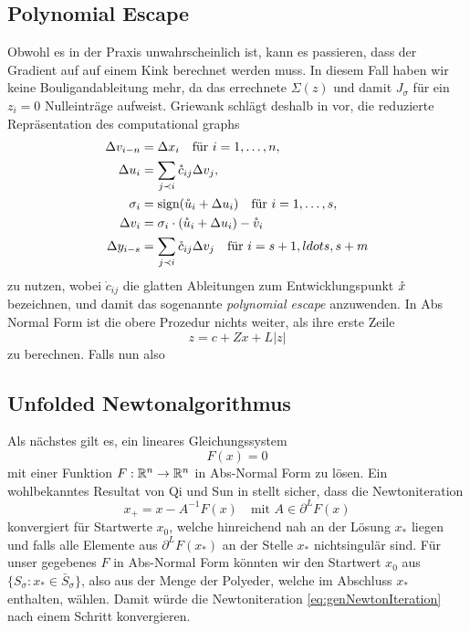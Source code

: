 \subsection{Polynomial Escape}
Obwohl es in der Praxis unwahrscheinlich ist, kann es passieren, dass der Gradient auf auf einem Kink berechnet werden muss. In diesem Fall haben wir keine Bouligandableitung mehr, da das errechnete $\Sigma(z)$ und damit $J_\sigma$ für ein $z_i=0$ Nulleinträge aufweist. Griewank schlägt deshalb in \cite[S.29]{monster} vor, die reduzierte Repräsentation des computational graphs 
\[
 \begin{aligned}
  \Delta v_{i-n} &= \Delta x_i \quad \text{für } i=1,\ldots,n, \\
  \Delta u_i &= \sum_{j\prec i} \mathring c_{ij}\Delta v_j,\\
  \sigma_i& = \text{sign}(\mathring u_i + \Delta u_i) \quad \text{für } i=1,\ldots,s,\\
  \Delta v_i &= \sigma_i \cdot (\mathring u_i+\Delta u_i) - \mathring{v}_i\\
  \Delta y_{i-s}& = \sum_{j\prec i} \mathring c_{ij} \Delta v_j \quad \text{für } i=s+1, ldots, s+m
 \end{aligned}
\]
zu nutzen, wobei $\mathring c_{ij}$ die glatten Ableitungen zum Entwicklungspunkt $\mathring{x}$ bezeichnen, und damit das sogenannte \textit{polynomial escape} anzuwenden. In Abs Normal Form ist die obere Prozedur nichts weiter, als ihre erste Zeile 
\[
  z = c+ Zx + L|z|
\]
zu berechnen. Falls nun also 

\begin{theorem}
 
\end{theorem}





\subsection{Unfolded Newtonalgorithmus}
Als nächstes gilt es, ein lineares Gleichungssystem 
\[
 F(x) = 0
\]
mit einer Funktion  $F:\mathbb{R}^n \to \mathbb{R}^n$ in Abs-Normal Form zu lösen.
Ein wohlbekanntes Resultat von Qi und Sun in \cite{qi1993nonsmooth} stellt sicher, dass die Newtoniteration
\begin{equation}
\label{eq:genNewtonIteration}
 x_+ = x- A^{-1}F(x)\quad \text{mit } A \in \partial^LF(x)
\end{equation}
konvergiert für Startwerte $x_0$, welche hinreichend nah an der Lösung $x_*$ liegen und falls alle Elemente aus $\partial^L F(x_*)$ an der Stelle $x_*$ nichtsingulär sind. 
Für unser gegebenes $F$ in Abs-Normal Form könnten wir den Startwert $x_0$ aus $\lbrace S_\sigma:x_*\in \bar S_\sigma \rbrace$, also aus der Menge der Polyeder, welche im Abschluss  $x_*$ enthalten, wählen. Damit würde die Newtoniteration \eqref{eq:genNewtonIteration} nach einem Schritt konvergieren. 

